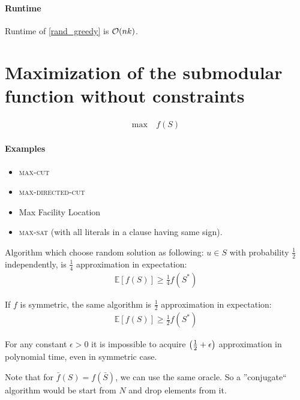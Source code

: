 \paragraph{Runtime} Runtime of \vref{rand_greedy} is $\order{nk}$.

\section{Maximization of the submodular function without constraints}
\begin{align}
\max \: & f(S)
\end{align}
\paragraph{Examples}
\begin{itemize}
\item \textsc{max-cut}
\item \textsc{max-directed-cut}
\item Max Facility Location
\item \textsc{max-sat} (with all literals in a clause having same sign).
\end{itemize}

\begin{prop}
	Algorithm which choose random solution as following: $u\in S$ with probability $\frac{1}{2}$ independently, is $\frac{1}{4}$ approximation in expectation:
	\begin{align}
	\mathbb{E}[f(S)] \geqslant \frac{1}{4} f(S^*)
	\end{align}
\end{prop}
\begin{prop}
If $f$ is symmetric, the same algorithm is $\frac{1}{2}$ approximation in expectation:
\begin{align}
\mathbb{E}[f(S)] \geqslant \frac{1}{2} f(S^*)
\end{align}
\end{prop}
\begin{prop} \label{prop:eps_max}
For any constant $\epsilon>0$ it is impossible to acquire $\qty(\frac{1}{2}+\epsilon)$ approximation in polynomial time, even in  symmetric case.
\end{prop}

Note that for $\bar{f}(S) = f(\bar{S})$, we can use the same oracle. So a ''conjugate`` algorithm would be start from $N$ and drop elements from it.


